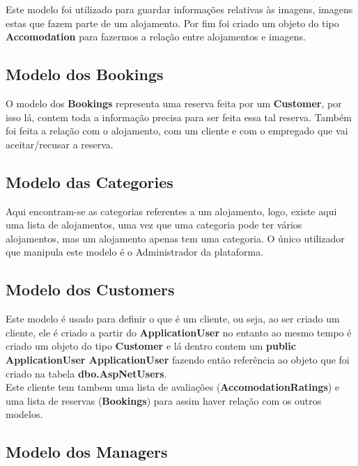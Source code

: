 \documentclass[11pt]{article}
\begin{document}
    Este modelo foi utilizado para guardar informações relativas às imagens, imagens estas que fazem parte de um alojamento. Por fim foi criado um objeto do tipo \textbf{Accomodation} para fazermos a relação entre alojamentos e imagens.
    
    
    \subsection{Modelo dos Bookings}
    \normalsize
    
    O modelo dos \textbf{Bookings} representa uma reserva feita por um \textbf{Customer}, por isso lá, contem toda a informação precisa para ser feita essa tal reserva. Também foi feita a relação com o alojamento, com um cliente e com o empregado que vai aceitar/recusar a reserva.
    
    
    \subsection{Modelo das Categories}
    \normalsize
    
    Aqui encontram-se as categorias referentes a um alojamento, logo, existe aqui uma lista de alojamentos, uma vez que uma categoria pode ter vários alojamentos, mas um alojamento apenas tem uma categoria. O único utilizador que manipula este modelo é o Administrador da plataforma.
    
    
    \subsection{Modelo dos Customers}
    \normalsize
    
    Este modelo é usado para definir o que é um cliente, ou seja, ao ser criado um cliente, ele é criado a partir do \textbf{ApplicationUser} no entanto ao mesmo tempo é criado um objeto do tipo \textbf{Customer} e lá dentro contem um \textbf{public ApplicationUser ApplicationUser} fazendo então referência ao objeto que foi criado na tabela \textbf{dbo.AspNetUsers}.\\
    Este cliente tem tambem uma lista de avaliações (\textbf{AccomodationRatings}) e uma lista de reservas  (\textbf{Bookings}) para assim haver relação com os outros modelos.
    
    
    \subsection{Modelo dos Managers}
    \normalsize
    
\end{document}
